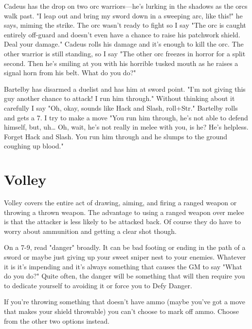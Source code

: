 \startExample
Cadeus has the drop on two orc warriors—he's lurking in the shadows as the orcs walk past. "I leap out and bring my sword down in a sweeping arc, like this!" he says, miming the strike. The orc wasn't ready to fight so I say "The orc is caught entirely off-guard and doesn't even have a chance to raise his patchwork shield. Deal your damage." Cadeus rolls his damage and it's enough to kill the orc. The other warrior is still standing, so I say "The other orc freezes in horror for a split second. Then he's smiling at you with his horrible tusked mouth as he raises a signal horn from his belt. What do you do?"
\stopExample
 
\startExample
Bartelby has disarmed a duelist and has him at sword point. "I'm not giving this guy another chance to attack! I run him through." Without thinking about it carefully I say "Oh, okay, sounds like Hack and Slash, roll+Str." Bartelby rolls and gets a 7. I try to make a move "You run him through, he's not able to defend himself, but, uh… Oh, wait, he's not really in melee with you, is he? He's helpless. Forget Hack and Slash. You run him through and he slumps to the ground coughing up blood."
\stopExample
 
\section{Volley}   
 

Volley covers the entire act of drawing, aiming, and firing a ranged weapon or throwing a thrown weapon. The advantage to using a ranged weapon over melee is that the attacker is less likely to be attacked back. Of course they do have to worry about ammunition and getting a clear shot though.

 

On a 7-9, read "danger" broadly. It can be bad footing or ending in the path of a sword or maybe just giving up your sweet sniper nest to your enemies. Whatever it is it's impending and it's always something that causes the GM to say "What do you do?" Quite often, the danger will be something that will then require you to dedicate yourself to avoiding it or force you to Defy Danger.

 

If you're throwing something that doesn't have ammo (maybe you've got a move that makes your shield throwable) you can't choose to mark off ammo. Choose from the other two options instead.

